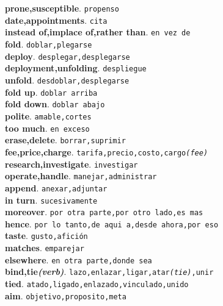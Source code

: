 \documentclass[twocolumn]{article}
\begin{document}
	\textsf{\textbf{prone,susceptible}}. \texttt{propenso}\\
	\textsf{\textbf{date,appointments}}. \texttt{cita}\\
	\textsf{\textbf{instead of,implace of,rather than}}. \texttt{en vez de}\\
	\textsf{\textbf{fold}}. \texttt{doblar,plegarse}\\
	\textsf{\textbf{deploy}}. \texttt{desplegar,desplegarse}\\
	\textsf{\textbf{deployment,unfolding}}. \texttt{despliegue}\\
	\textsf{\textbf{unfold}}. \texttt{desdoblar,desplegarse}\\
	\textsf{\textbf{fold up}}. \texttt{doblar arriba}\\
	\textsf{\textbf{fold down}}. \texttt{doblar abajo}\\
	\textsf{\textbf{polite}}. \texttt{amable,cortes}\\
	\textsf{\textbf{too much}}. \texttt{en exceso}\\
	\textsf{\textbf{erase,delete}}. \texttt{borrar,suprimir}\\
	\textsf{\textbf{fee,price,charge}}. \texttt{tarifa,precio,costo,cargo{\scriptsize \textit{(fee)}}}\\
	\textsf{\textbf{research,investigate}}. \texttt{investigar}\\
	\textsf{\textbf{operate,handle}}. \texttt{manejar,administrar}\\
	\textsf{\textbf{append}}. \texttt{anexar,adjuntar}\\
	\textsf{\textbf{in turn}}. \texttt{sucesivamente}\\
	\textsf{\textbf{moreover}}. \texttt{por otra parte,por otro lado,es mas}\\
	\textsf{\textbf{hence}}. \texttt{por lo tanto,de aqui a,desde ahora,por eso}\\
	\textsf{\textbf{taste}}. \texttt{gusto,afici\'on}\\
	\textsf{\textbf{matches}}. \texttt{emparejar}\\
	\textsf{\textbf{elsewhere}}. \texttt{en otra parte,donde sea}\\
	\textsf{\textbf{bind,tie{\scriptsize \textit{(verb)}}}}. \texttt{lazo,enlazar,ligar,atar{\scriptsize \textit{(tie)}},unir}\\
	\textsf{\textbf{tied}}. \texttt{atado,ligado,enlazado,vinculado,unido}\\
	\textsf{\textbf{aim}}. \texttt{objetivo,proposito,meta}\\
\end{document}
